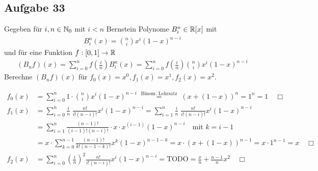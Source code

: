 \subsection*{Aufgabe 33}
Gegeben für $i, n \in \mathbb N_0$ mit $i < n$ Bernstein Polynome $B_i^n \in \mathbb R[x]$ mit
\begin{align}
  B_i^n(x) = \binom{n}{i} x^i(1 - x)^{n-i}
\end{align}
und für eine Funktion $f: [0,1] \rightarrow \mathbb R$
\begin{align}
  (B_n f)(x) = \sum_{i = 0}^n f\left(\frac{i}{n}\right) B_i^n(x) =
  \sum_{i = 0}^n f\left(\frac{i}{n}\right) \binom{n}{i} x^i(1 - x)^{n-i}
\end{align}
Berechne $(B_n f)(x)$ für $f_0(x) = x^0, f_1(x) = x^1, f_2(x) = x^2$.

\begin{align*}
  f_0(x) &= \sum_{i = 0}^n 1 \cdot \binom{n}{i} x^i(1 - x)^{n-i}
    \; \overset{\text{Binom. Lehrsatz}}{=} \; \left( x + (1 -x) \right)^n = 1^n = 1 \quad \Box\\
  f_1(x) &= \sum_{i = 0}^n \frac{i}{n} \; \frac{n!}{i! (n-i)!} x^i(1 - x)^{n-i} =
    \sum_{i = 1}^n \frac{i}{n} \; \frac{n!}{i! (n-i)!} x^i(1 - x)^{n-i} \\
    & = \sum_{i = 1}^n \frac{(n-1)!}{(i-1)! (n-i)!} \cdot x \cdot x^{(i-1)}(1 - x)^{n-i}
    \quad \text{mit $k = i - 1$} \\
    & = x  \cdot \sum_{k = 0}^{n-1} \frac{(n-1)!}{k! (n-1-k)!} x^k(1 - x)^{n-1-k}
    = x \cdot \left( x + (1 -x) \right)^{n-1} = x \cdot 1^{n-1} = x  \quad \Box\\
  f_2(x) &= \sum_{i = 0}^n \left(\frac{i}{n}\right)^2 \frac{n!}{i! (n-i)!} x^i(1 - x)^{n-i} =
  \text{TODO} = \frac{x}{n} + \frac{n-1}{n} x^2  \quad \Box
\end{align*}

